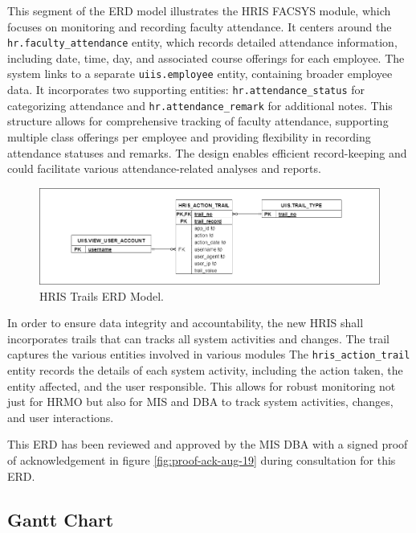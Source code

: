     This segment of the ERD model illustrates the HRIS FACSYS module, which focuses on monitoring and recording faculty attendance. It centers around the \texttt{hr.faculty\_attendance} entity, which records detailed attendance information, including date, time, day, and associated course offerings for each employee. The system links to a separate \texttt{uiis.employee} entity, containing broader employee data. It incorporates two supporting entities: \texttt{hr.attendance\_status} for categorizing attendance and \texttt{hr.attendance\_remark} for additional notes. This structure allows for comprehensive tracking of faculty attendance, supporting multiple class offerings per employee and providing flexibility in recording attendance statuses and remarks. The design enables efficient record-keeping and could facilitate various attendance-related analyses and reports.

    \begin{figure}[H]
        \centering
        \includegraphics[width=1\linewidth]{figures/images/diagrams/erd/erd-trails.png}
        \caption{HRIS Trails ERD Model.}
        \label{fig:erd-trails}
    \end{figure}

    In order to ensure data integrity and accountability, the new HRIS shall incorporates trails that can tracks all system activities and changes. The trail captures the various entities involved in various modules The \texttt{hris\_action\_trail} entity records the details of each system activity, including the action taken, the entity affected, and the user responsible. This allows for robust monitoring not just for HRMO but also for MIS and DBA to track system activities, changes, and user interactions. 

    This ERD has been reviewed and approved by the MIS DBA with a signed proof of acknowledgement in figure \ref{fig:proof-ack-aug-19} during consultation for this ERD. 
    
    \subsection{Gantt Chart}
    
